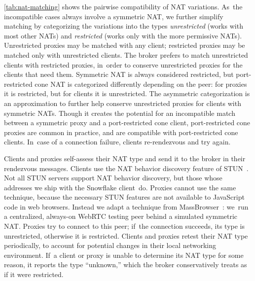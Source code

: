 \documentclass[letterpaper,twocolumn]{article}
\newcommand{\firstterm}[1]{\textit{#1}}
\begin{document}
\autoref{tab:nat-matching}
shows the pairwise compatibility of NAT variations.
As~the incompatible cases always involve a symmetric NAT,
we further simplify matching by categorizing the variations into the types
\firstterm{unrestricted} (works with most other NATs) and
\firstterm{restricted} (works only with the more permissive NATs).
Unrestricted proxies may be matched with any client;
restricted proxies may be matched only with unrestricted clients.
The broker prefers to match unrestricted clients with restricted proxies,
in~order to conserve unrestricted proxies
for the clients that need them.
Symmetric NAT is always considered restricted,
but port-restricted cone NAT is categorized differently
depending on the peer:
for proxies it is restricted, but
for clients it is unrestricted.
The asymmetric categorization is an approximation
to further help conserve unrestricted proxies
for clients with symmetric NATs.
Though it creates the potential for an incompatible match
between a symmetric proxy and a port-restricted cone client,
port-restricted cone proxies are common in practice,
and are compatible with port-restricted cone clients.
In~case of a connection failure,
clients re-rendezvous and try again.

Clients and proxies self-assess their NAT type
and send it to the broker in their rendezvous messages.
Clients use the NAT behavior discovery feature of STUN~\cite{rfc5780}.
Not all STUN servers support NAT behavior discovery,
but those whose addresses we ship with the Snowflake client~do.
Proxies cannot use the same technique,
because the necessary STUN features are not available
to JavaScript code in web browsers.
Instead
we adapt a technique from MassBrowser~\cite[\S \mbox{V-A}]{Nasr2020a}:
we~run a centralized, always-on WebRTC testing peer
behind a simulated symmetric NAT.
Proxies try to connect to this peer;
if~the connection succeeds, its type is unrestricted,
otherwise it is restricted.
Clients and proxies retest their NAT type periodically,
to account for potential changes in their local networking environment.
If~a client or proxy is unable to determine its NAT type for some reason,
it reports the type ``unknown,''
which the broker conservatively treats as if it were restricted.
\end{document}
